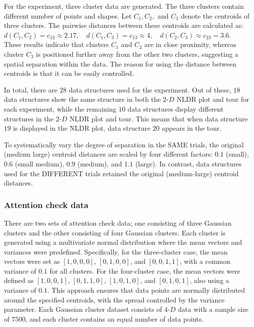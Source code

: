 \documentclass[
  11pt,
  a4paper,
]{report}
\newcommand\gD{$2\text{-}D$}
\newcommand\hD{$4\text{-}D$}
\begin{document}
For the experiment, three cluster data are generated. The three clusters
contain different number of points and shapes. Let \(C_1, C_2,\) and
\(C_3\) denote the centroids of three clusters. The pairwise distances
between these centroids are calculated as:
\(d(C_1, C_2) = c_{12} \approx 2.17, \quad d(C_1, C_3) = c_{13} \approx 4, \quad d(C_2, C_3) \approx c_{23} = 3.6\).
These results indicate that clusters \(C_1\) and \(C_2\) are in close
proximity, whereas cluster \(C_3\) is positioned further away from the
other two clusters, suggesting a spatial separation within the data. The
reason for using the distance between centroids is that it can be easily
controlled.

In total, there are \(28\) data structures used for the experiment. Out
of these, \(18\) data structures show the same structure in both the
\gD{} NLDR plot and tour for each experiment, while the remaining \(10\)
data structures display different structures in the \gD{} NLDR plot and
tour. This means that when data structure \(19\) is displayed in the
NLDR plot, data structure \(20\) appears in the tour.

To systematically vary the degree of separation in the SAME trials, the
original (medium large) centroid distances are scaled by four different
factors: \(0.1\) (small), \(0.6\) (small medium), \(0.9\) (medium), and
\(1.1\) (large). In contrast, data structures used for the DIFFERENT
trials retained the original (medium-large) centroid distances.

\subsubsection{Attention check data}\label{attention-check-data}

There are two sets of attention check data; one consisting of three
Gaussian clusters and the other consisting of four Gaussian clusters.
Each cluster is generated using a multivariate normal distribution where
the mean vectors and variances were predefined. Specifically, for the
three-cluster case, the mean vectors were set as \([1, 0, 0, 0]\),
\([0, 1, 0, 0]\), and \([0, 0, 1, 1]\), with a common variance of
\(0.1\) for all clusters. For the four-cluster case, the mean vectors
were defined as \([1, 0, 0, 1]\), \([0, 1, 1, 0]\), \([1, 0, 1, 0]\),
and \([0, 1, 0, 1]\), also using a variance of \(0.1\). This approach
ensures that data points are normally distributed around the specified
centroids, with the spread controlled by the variance parameter. Each
Gaussian cluster dataset consists of \hD{} data with a sample size of
\(7500\), and each cluster contains an equal number of data points.
\end{document}
